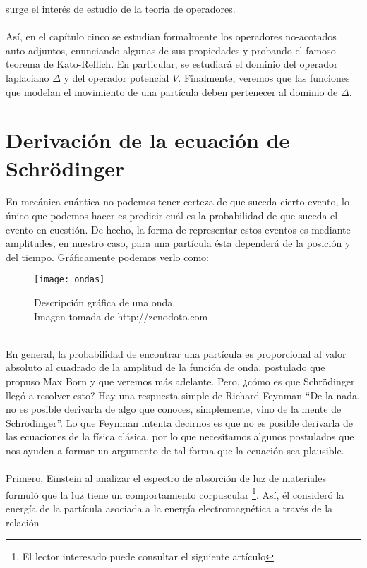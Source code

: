 \documentclass[12pt]{article}
\theoremstyle{definition}
\begin{document}
 surge el interés de estudio de la teoría de operadores.
\\ \\
Así, en el capítulo cinco se estudian formalmente los operadores no-acotados auto-adjuntos, enunciando algunas de sus propiedades y probando el famoso teorema de Kato-Rellich. En particular, se estudiará el dominio del operador laplaciano $\Delta$ y del operador potencial $V$. Finalmente, veremos que las funciones que modelan el movimiento de una partícula deben pertenecer al dominio de $\Delta$.

\mainmatter

\newpage
\section{Derivación de la ecuación de Schrödinger}
\noindent
En mecánica cuántica no podemos tener certeza de que suceda cierto evento, lo único que podemos hacer es predicir cuál es la probabilidad de que suceda el evento en cuestión. De hecho, la forma de representar estos eventos es mediante amplitudes, en nuestro caso, para una partícula ésta dependerá de la posición y del tiempo. Gráficamente podemos verlo como:
\\
\begin{figure}[h]
    \texttt{[image: ondas]}
    \caption{Descripción gráfica de una onda. \\ Imagen tomada de http://zenodoto.com}
    \label{fig:onda}
\end{figure}
\\
En general, la probabilidad de encontrar una partícula es proporcional al valor absoluto al cuadrado de la amplitud de la función de onda, postulado que propuso Max Born y que veremos más adelante. Pero, ¿cómo es que Schrödinger llegó a resolver esto? Hay una respuesta simple de Richard Feynman ``De la nada, no es posible derivarla de algo que conoces, simplemente, vino de la mente de Schrödinger''. Lo que Feynman intenta decirnos es que no es posible derivarla de las ecuaciones de la física clásica, por lo que necesitamos algunos postulados que nos ayuden a formar un argumento de tal forma que la ecuación sea plausible. 
\\
\\
Primero, Einstein al analizar el espectro de absorción de luz de materiales formuló que la luz tiene un comportamiento corpuscular \footnote{El lector interesado puede consultar el siguiente artículo }. Así, él  consideró la energía de la partícula asociada a la energía electromagnética a través de la relación
\end{document}
